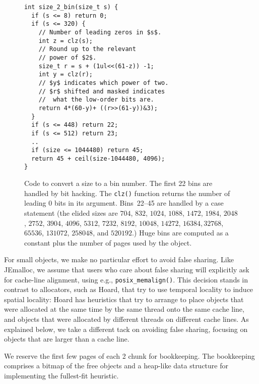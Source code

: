 \documentclass[pldi]{sigplanconf-pldi15}
\newcommand{\code}[1]{\texttt{#1}}
\newcommand{\bcknote}[1]{\cnote{red}{#1}{bck}}
\begin{document}
\begin{figure}
\begin{verbatim}
int size_2_bin(size_t s) {
  if (s <= 8) return 0;
  if (s <= 320) {
    // Number of leading zeros in $s$.
    int z = clz(s);
    // Round up to the relevant
    // power of $2$.
    size_t r = s + (1ul<<(61-z)) -1;
    int y = clz(r);
    // $y$ indicates which power of two.
    // $r$ shifted and masked indicates
    //  what the low-order bits are.
    return 4*(60-y)+ ((r>>(61-y))&3);
  }
  if (s <= 448) return 22;
  if (s <= 512) return 23;
  ..
  if (size <= 1044480) return 45;
  return 45 + ceil(size-1044480, 4096);
}
\end{verbatim}
\caption{Code to convert a size to a bin number.  The first 22 bins
  are handled by bit hacking. The \code{clz()} function returns the
  number of leading 0 bits in its argument. Bins~22--45 are handled by
  a case statement (the elided sizes are $704$, $832$, $1024$, $1088$,
  $1472$, $1984$, $2048$, $2752$, $3904$, $4096$, $5312$, $7232$,
  $8192$, $10048$, $14272$, $16384, 32768$, $65536$, $131072$,
  $258048$, and $520192$.)  Huge bins are computed as a constant plus
  the number of pages used by the object.}
\label{fig:size2bin}
\end{figure}

For small objects, we make no particular effort to avoid false
sharing.  Like JEmalloc, we assume that users who care about false
sharing will explicitly ask for cache-line alignment, using e.g.,
\code{posix_memalign()}.  This decision stands in contrast to
allocators, such as Hoard, that try to use temporal locality to induce
spatial locality: Hoard has heuristics that try to arrange to place
objects that were allocated at the same time by the same thread onto
the same cache line, and objects that were allocated by different
threads on different cache lines.  As explained below, we take a
different tack on avoiding false sharing, focusing on objects that are
larger than a cache line.

We reserve the first few pages of each \unit{2}\mebi\byte{} chunk for
bookkeeping.  The bookkeeping comprises a bitmap of the free objects
and a heap-like data structure for implementing the fullest-fit
heuristic. \bcknote{Explain how we implement fullest fit}

\end{document}
